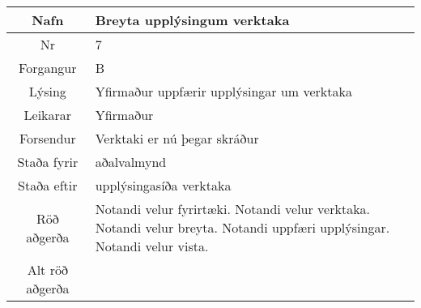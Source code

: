 \documentclass[a4paper]{article}
\begin{document}
\begin{tabular}{|c|p{10cm}|}
\hline
Nafn&Breyta upplýsingum verktaka \\
\hline
Nr&7\\
\hline
Forgangur&B\\
\hline
Lýsing&Yfirmaður uppfærir upplýsingar um verktaka\\
\hline
Leikarar&Yfirmaður\\
\hline
Forsendur&Verktaki er nú þegar skráður\\
\hline
Staða fyrir&aðalvalmynd\\
\hline
Staða eftir&upplýsingasíða verktaka\\
\hline
Röð aðgerða&Notandi velur fyrirtæki. Notandi velur verktaka. Notandi velur breyta. Notandi uppfæri upplýsingar. Notandi velur vista.\\
\hline
Alt röð aðgerða&\\
\hline
\end{tabular}
\end{document}
